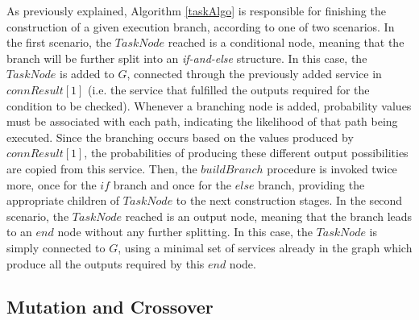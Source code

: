 As previously explained, Algorithm \ref{taskAlgo} is responsible for finishing the construction of a given execution branch, according to one of two scenarios. In the first scenario, the $TaskNode$ reached is a conditional node, meaning that the branch will be further split into an \textit{if-and-else} structure. In this case, the $TaskNode$ is added to $G$, connected through the previously added service in $connResult[1]$ (i.e. the service that fulfilled the outputs required for the condition to be checked). Whenever a branching node is added, probability values must be associated with each path, indicating the likelihood of that path being executed. Since the branching occurs based on the values produced by  
$connResult[1]$, the probabilities of producing these different output possibilities are copied from this service. Then, the $buildBranch$ procedure is invoked twice more, once for the $if$ branch and once for the $else$ branch, providing the appropriate children of $TaskNode$ to the next construction stages. In the second scenario, the $TaskNode$ reached is an output node, meaning that the branch leads to an $end$ node without any further splitting. In this case, the $TaskNode$ is simply connected to $G$, using a minimal set of services already in the graph which produce all the outputs required by this $end$ node.

\subsection{Mutation and Crossover}

